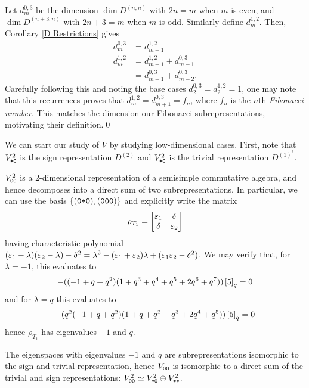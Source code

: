 \documentclass{amsart}
\begin{document}
\begin{remark}
  Let $d_{m}^{0,3}$ be the dimension $\dim D^{(n,n)}$ with $2n = m$ when $m$ is even, and $\dim D^{(n+3,n)}$ with $2n + 3 = m$ when $m$ is odd.
  Similarly define $d_m^{1,2}$.
  Then, Corollary \ref{D Restrictions} gives
  \begin{align*}
    d_m^{0,3} &= d_{m-1}^{1,2}\\
    d_m^{1,2} &= d_{m-1}^{1,2} + d_{m-1}^{0,3}\\
    &= d_{m-1}^{0,3} + d_{m-2}^{0,3}.
  \end{align*}
  Carefully following this and noting the base cases $d_2^{0,3} = d_2^{1,2} = 1$, one may note that this recurrences proves that $d_m^{1,2} = d_{m+1}^{0,3} = f_n$, where $f_n$ is the $n$th \emph{Fibonacci number}.
  This matches the dimension our Fibonacci subrepresentations, motivating their definition.\qed
\end{remark}

We can start our study of $V$ by studying low-dimensional cases.
First, note that $V_{\texttt{*}\texttt{0}}^2$ is the sign representation $D^{(2)}$ and $V_{\texttt{*}\texttt{0}}^2$ is the trivial representation $D^{(1)^2}$.

$V_{\texttt{0}\texttt{0}}^2$ is a 2-dimensional representation of a semisimple commutative algebra, and hence decomposes into a direct sum of two subrepresentations.
In particular, we can use the basis $\left\{ (\texttt{0}\texttt{*}\texttt{0}),(\texttt{0}\texttt{0}\texttt{0}) \right\}$ and explicitly write the matrix
\[
  \rho_{T_1} = \begin{bmatrix}
    \varepsilon_1 & \delta\\
    \delta & \varepsilon_2
  \end{bmatrix}
\]
having characteristic polynomial $(\varepsilon_1 - \lambda)(\varepsilon_2 - \lambda) - \delta^2 = \lambda^2 - (\varepsilon_1 + \varepsilon_2)\lambda +(\varepsilon_1\varepsilon_2 - \delta^2)$.
We may verify that, for $\lambda = -1$, this evaluates to
\[
  -((-1 + q + q^2) (1 + q^3 + q^4 + q^5 + 2 q^6 + q^7))\left[ 5 \right]_q = 0
\]
and for $\lambda = q$ this evaluates to 
\[
-(q^2 (-1 + q + q^2) (1 + q + q^2 + q^3 + 2 q^4 + q^5)) \left[ 5 \right]_q = 0
\]
hence $\rho_{T_1}$ has eigenvalues $-1$ and $q$.

The eigenspaces with eigenvalues $-1$ and $q$ are subrepresentations isomorphic to the sign and trivial representation, hence $V_{\texttt{0}\texttt{0}}$ is isomorphic to a direct sum of the trivial and sign representations: $V^2_{\texttt{0}\texttt{0}} \simeq V^2_{\texttt{*}\texttt{0}} \oplus V^2_{\texttt{*}\texttt{*}}$. 
\end{document}
